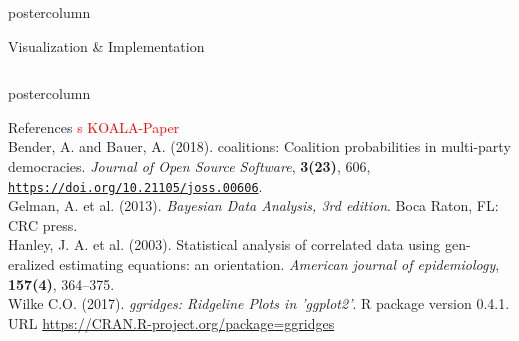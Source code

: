 \documentclass[final,hyperref={pdfpagelabels=false}]{beamer}
\begin{document}
\begin{frame}
\begin{columns}
\begin{column}{1\textwidth}
\begin{columns}[T]
\begin{column}{.484\textwidth}
\begin{beamercolorbox}[center,wd=\textwidth]{postercolumn}
\begin{minipage}[T]{.95\textwidth}
\begin{block}{\footnotesize Visualization \& Implementation}
%
%
\end{block}


\end{minipage}
\end{beamercolorbox}
\end{column}

\begin{column}{.016\textwidth}
\end{column}

\end{columns}


\vspace{12px}
\begin{beamercolorbox}[center,wd=\textwidth]{postercolumn}
\begin{minipage}[T]{.95\textwidth}  %
\begin{block}{\footnotesize References}
{\footnotesize
\textcolor{red}{s KOALA-Paper} \\
Bender, A. and Bauer, A. (2018). coalitions: Coalition probabilities in multi-party democracies.
\textit{Journal of Open Source Software}, \textbf{3(23)}, 606,
\href{https://doi.org/10.21105/joss.00606}{\texttt{https://doi.org/10.21105/joss.00606}}. \\
Gelman, A. et al. (2013). \textit{Bayesian Data Analysis, 3rd edition}. Boca Raton, FL: CRC press. \\
Hanley, J. A. et al. (2003). Statistical analysis of correlated data using gen-
eralized estimating equations: an orientation. \textit{American journal of epidemiology},
\textbf{157(4)}, 364--375. \\
Wilke C.O. (2017). \textit{ggridges: Ridgeline Plots in 'ggplot2'}. R package version
0.4.1. URL \href{https://CRAN.R-project.org/package=ggridges}{https://CRAN.R-project.org/package=ggridges}
}
\end{block}
\end{minipage}
\end{beamercolorbox}


\end{column}
\end{columns}
\end{frame}
\end{document}
